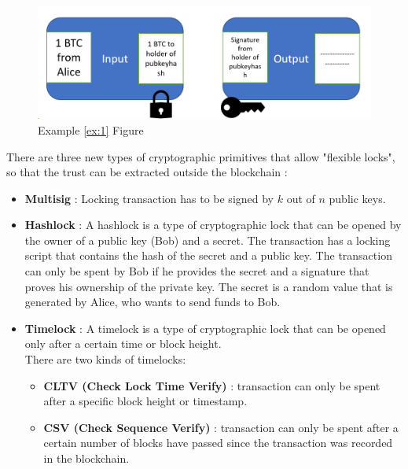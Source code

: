 \documentclass{report}
\begin{document}
\begin{figure}[h!]
	\centering
	\includegraphics[width=0.7\linewidth]{Fig/F1}
	\caption{Example \ref{ex:1} Figure}
	\label{fig:f1}
\end{figure}

There are three new types of cryptographic primitives that allow "flexible locks", so that the trust can be extracted outside the blockchain :
\begin{itemize}
	\item \textbf{Multisig} : Locking transaction has to be signed by $k$ out of $n$ public keys.
	\item \textbf{Hashlock} : A hashlock is a type of cryptographic lock that can be opened by the owner of a public key (Bob) and a secret. The transaction has a locking script that contains the hash of the secret and a public key. The transaction can only be spent by Bob if he provides the secret and a signature that proves his ownership of the private key. The secret is a random value that is generated by Alice, who wants to send funds to Bob.
	\item \textbf{Timelock} : A timelock is a type of cryptographic lock that can be opened only after a certain time or block height.\\
	There are two kinds of timelocks:
	\begin{itemize}
		\item \textbf{CLTV (Check Lock Time Verify)} : transaction can only be spent after a specific block height or timestamp.
		\item \textbf{ CSV (Check Sequence Verify)} :  transaction can only be spent after a certain number of blocks have passed since the transaction was recorded in the blockchain.
	\end{itemize}
\end{itemize}
\end{document}
